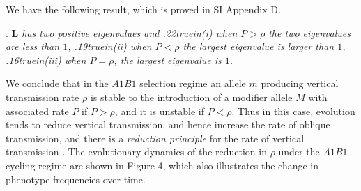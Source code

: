 \documentclass[9pt,twocolumn,twoside,lineno]{pnas-new}
\newcommand{\cl}{\mathbf{L}}
\newcommand{\ci}{\mathbf{I}}
\newcommand{\an}[1]{\begin{align}#1\end{align}}
\begin{document}
% 
 
%
We have the following result, which is proved in SI Appendix D.
 
 . {\sl $\cl$ has two positive eigenvalues and\hfil\break
  {\hglue.22truein}(i) when $P>\rho$ the two eigenvalues are less than $1$,\hfil\break
  {\hglue.19truein}(ii) when $P<\rho$ the largest eigenvalue is larger than $1$,\hfil\break
  {\hglue.16truein}(iii) when $P=\rho$, the largest eigenvalue is $1$.}\par
  \medskip

 We conclude that in the $A1B1$ selection regime an allele $m$ producing vertical transmission rate $\rho$ is stable to the introduction of a modifier allele $M$ with associated rate $P$ if $P>\rho$, and it is unstable if $P<\rho$. Thus in this case, evolution tends to reduce vertical transmission, and hence increase the rate of oblique transmission,  and there is a {\sl reduction principle} for the rate of vertical transmission \cite{feldman1986evolutionary,altenberg2017unified}. The evolutionary dynamics of the reduction in $\rho$ under the $A1B1$ cycling regime are shown in Figure 4, which also illustrates the change in phenotype frequencies over time. 
 
\end{document}
